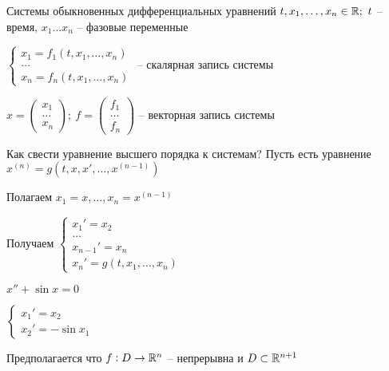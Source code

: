 \documentclass[12pt]{article}
\begin{document}
\begin{defin}{Системы обыкновенных дифференциальных уравнений}
    $t, x_1, \ldots, x_n \in \mathbb R;\ t$ -- время, $x_1 \ldots x_n$ -- фазовые переменные

    $\begin{cases}
        x_1 = f_1(t, x_1, \ldots, x_n) \\
        \ldots \\
        x_n = f_n(t, x_1, \ldots, x_n)
    \end{cases}$ -- скалярная запись системы

    $x = \begin{pmatrix}
        x_1 \\
        \ldots \\
        x_n
    \end{pmatrix};\ f = \begin{pmatrix}
        f_1 \\
        \ldots \\
        f_n
    \end{pmatrix}$ -- векторная запись системы
\end{defin}

\begin{nota}{Как свести уравнение высшего порядка к системам?}
    Пусть есть уравнение $x^{(n)} = g(t, x, x', \ldots, x^{(n-1)})$

    Полагаем $x_1 = x, \ldots, x_n = x^{(n-1)}$

    Получаем $\begin{cases}
        x_1' = x_2 \\
        \ldots \\
        x_{n-1}' = x_n \\
        x_n' = g(t, x_1, \ldots, x_n)
    \end{cases}$
\end{nota}

\begin{Example}{}
    $x'' + \sin x = 0$

    $\begin{cases}
        x_1' = x_2 \\
        x_2' = -\sin x_1
    \end{cases}$
\end{Example}

\begin{Remark}{}
    Предполагается что $f : D \to \mathbb R^n$ -- непрерывна и $D \subset \mathbb R^{n + 1}$
\end{Remark}
\end{document}
